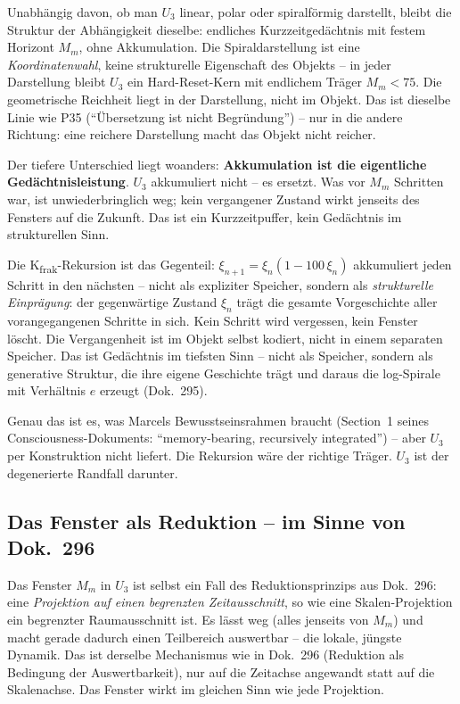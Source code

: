Unabhängig davon, ob man $U_3$ linear, polar oder spiralförmig darstellt,
bleibt die Struktur der Abhängigkeit dieselbe: endliches Kurzzeitgedächtnis
mit festem Horizont $M_m$, ohne Akkumulation. Die Spiraldarstellung ist
eine \emph{Koordinatenwahl}, keine strukturelle Eigenschaft des Objekts --
in jeder Darstellung bleibt $U_3$ ein Hard-Reset-Kern mit endlichem Träger
$M_m < 75$. Die geometrische Reichheit liegt in der Darstellung, nicht im
Objekt. Das ist dieselbe Linie wie P35 (\enquote{Übersetzung ist nicht
Begründung}) -- nur in die andere Richtung: eine reichere Darstellung macht
das Objekt nicht reicher.

Der tiefere Unterschied liegt woanders: \textbf{Akkumulation ist die
eigentliche Gedächtnisleistung}. $U_3$ akkumuliert nicht -- es ersetzt.
Was vor $M_m$ Schritten war, ist unwiederbringlich weg; kein vergangener
Zustand wirkt jenseits des Fensters auf die Zukunft. Das ist ein
Kurzzeitpuffer, kein Gedächtnis im strukturellen Sinn.

Die K\textsubscript{frak}-Rekursion ist das Gegenteil:
$\xi_{n+1} = \xi_n(1 - 100\,\xi_n)$ akkumuliert jeden Schritt in den
nächsten -- nicht als expliziter Speicher, sondern als
\emph{strukturelle Einprägung}: der gegenwärtige Zustand $\xi_n$ trägt
die gesamte Vorgeschichte aller vorangegangenen Schritte in sich. Kein
Schritt wird vergessen, kein Fenster löscht. Die Vergangenheit ist im
Objekt selbst kodiert, nicht in einem separaten Speicher. Das ist
Gedächtnis im tiefsten Sinn -- nicht als Speicher, sondern als generative
Struktur, die ihre eigene Geschichte trägt und daraus die log-Spirale mit
Verhältnis $e$ erzeugt (Dok.~295).

Genau das ist es, was Marcels Bewusstseinsrahmen braucht (Section~1 seines
Consciousness-Dokuments: \enquote{memory-bearing, recursively integrated})
-- aber $U_3$ per Konstruktion nicht liefert. Die Rekursion wäre der
richtige Träger. $U_3$ ist der degenerierte Randfall darunter.

\subsection*{Das Fenster als Reduktion -- im Sinne von Dok.~296}

Das Fenster $M_m$ in $U_3$ ist selbst ein Fall des Reduktionsprinzips aus
Dok.~296: eine \emph{Projektion auf einen begrenzten Zeitausschnitt}, so
wie eine Skalen-Projektion ein begrenzter Raumausschnitt ist. Es lässt weg
(alles jenseits von $M_m$) und macht gerade dadurch einen Teilbereich
auswertbar -- die lokale, jüngste Dynamik. Das ist derselbe Mechanismus wie
in Dok.~296 (Reduktion als Bedingung der Auswertbarkeit), nur auf die
Zeitachse angewandt statt auf die Skalenachse. Das Fenster wirkt im
gleichen Sinn wie jede Projektion.

